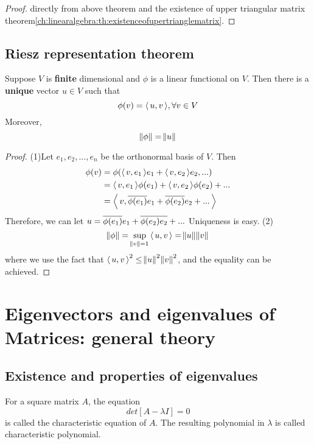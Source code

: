 \begin{refsection}
\begin{proof}
directly from above theorem and the existence of upper triangular matrix theorem\autoref{ch:linearalgebra:th:existenceofupertrianglematrix}.
\end{proof}



\subsection{Riesz representation theorem}
\begin{theorem}
\cite[188]{axler2015linear}\cite[345]{johnsonbaugh2010foundations} Suppose $V$ is \textbf{finite} dimensional and $\phi$ is a linear functional on $V$. Then there is a \textbf{unique} vector $u\in V$ such that 
$$\phi(v) = {\left< \, u,v \, \right>},\forall v\in V$$
Moreover, $$\norm{\phi} = \norm{u}$$
\end{theorem}

\begin{proof}
(1)Let $e_1,e_2,...,e_n$ be the orthonormal basis of $V$. Then
\begin{align*}
    \phi(v) &= \phi({\left< \, v,e_1 \, \right>}e_1 + {\left< \, v,e_2 \, \right>}e_2,...) \\
    & = {\left< \, v,e_1 \, \right>}\phi(e_1) + {\left< \, v,e_2 \, \right>}\phi(e_2) + ...\\
    & = {\left< \, v,\overline{\phi(e_1)}e_1 + \overline{\phi(e_2)}e_2+ ... \, \right>} 
\end{align*}
Therefore, we can let $u = \overline{\phi(e_1)}e_1 + \overline{\phi(e_2)e_2} + ...$
Uniqueness is easy.
(2) $$\norm{\phi} = \sup_{\norm{v}=1}{\left< \, u,v \, \right>} =\norm{u}\norm{v}$$
where we use the fact that ${\left< \, u,v \, \right>}^2 \leq \norm{u}^2\norm{v}^2$, and the equality can be achieved.
\end{proof}






\section{Eigenvectors and eigenvalues of Matrices: general theory}

\subsection{Existence and properties of eigenvalues}
\begin{definition}
	For a square matrix $A$, the equation
	$$det[A-\lambda I] = 0$$
	is called the characteristic equation of $A$. The resulting polynomial in $\lambda$ is called characteristic polynomial.
\end{definition}


\end{refsection}
